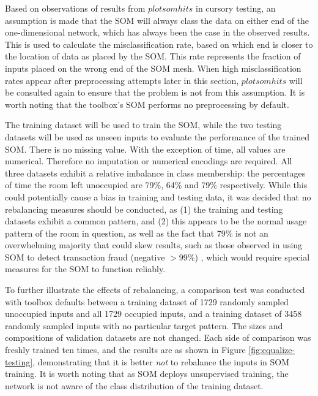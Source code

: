 \documentclass[10pt, oneside]{article}
\begin{document}
Based on observations of results from $plotsomhits$ in cursory testing, an assumption is made that the SOM will always class the data on either end of the one-dimensional network, which has always been the case in the observed results. This is used to calculate the misclassification rate, based on which end is closer to the location of data as placed by the SOM. This rate represents the fraction of inputs placed on the wrong end of the SOM mesh. When high misclassification rates appear after preprocessing attempts later in this section, $plotsomhits$ will be consulted again to ensure that the problem is not from this assumption. It is worth noting that the toolbox's SOM performs no preprocessing by default.

The training dataset will be used to train the SOM, while the two testing datasets will be used as unseen inputs to evaluate the performance of the trained SOM. There is no missing value. With the exception of time, all values are numerical. Therefore no imputation or numerical encodings are required. All three datasets exhibit a relative imbalance in class membership: the percentages of time the room left unoccupied are 79\%, 64\% and 79\% respectively. While this could potentially cause a bias in training and testing data, it was decided that no rebalancing measures should be conducted, as (1) the training and testing datasets exhibit a common pattern, and (2) this appears to be the normal usage pattern of the room in question, as well as the fact that 79\% is not an overwhelming majority that could skew results, such as those observed in using SOM to detect transaction fraud (negative $>$99\%) \cite{almendra2014using}, which would require special measures for the SOM to function reliably. 

To further illustrate the effects of rebalancing, a comparison test was conducted with toolbox defaults between a training dataset of 1729 randomly sampled unoccupied inputs and all 1729 occupied inputs, and a training dataset of 3458 randomly sampled inputs with no particular target pattern. The sizes and compositions of validation datasets are not changed. Each side of comparison was freshly trained ten times, and the results are as shown in Figure \ref{fig:equalize-testing}, demonstrating that it is better \textit{not} to rebalance the inputs in SOM training. It is worth noting that as SOM deploys unsupervised training, the network is not aware of the class distribution of the training dataset.
\end{document}
